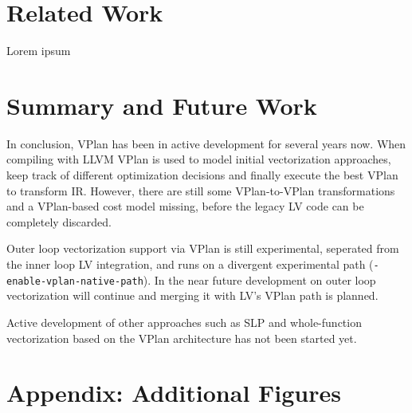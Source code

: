 \documentclass[sigplan,11pt,nonacm]{acmart}
\begin{document}


\section{Related Work}
\label{sec:relatedwork}
Lorem ipsum




\section{Summary and Future Work}
\label{sec:summary}
In conclusion, VPlan has been in active development for several years now. When compiling with
LLVM VPlan is used to model initial vectorization approaches, keep track of different
optimization decisions and finally execute the best VPlan to transform IR. 
However, there are still some VPlan-to-VPlan transformations and a VPlan-based cost model missing, 
before the legacy LV code can be completely discarded.

Outer loop vectorization support via VPlan is still experimental, seperated from the inner loop
LV integration, and runs on a divergent experimental path (\texttt{-enable-vplan-native-path}).
In the near future development on outer loop vectorization will continue and merging it with LV's
VPlan path is planned.

Active development of other approaches such as SLP and whole-function vectorization based on the 
VPlan architecture has not been started yet.




\appendix

\section{Appendix: Additional Figures}
\end{document}
